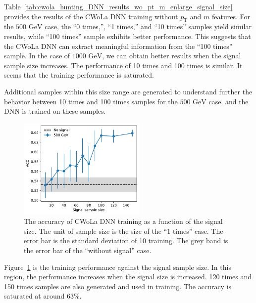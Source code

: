 \documentclass[12pt]{article}
\begin{document}
		Table~\ref{tab:cwola_hunting_DNN_results_wo_pt_m_enlarge_signal_size} provides the results of the CWoLa DNN training without $p_{\text{T}}$ and $m$ features. For the $\text{500 GeV}$ case, the ``0 times,'', ``1 times,'' and ``10 times'' samples yield similar results, while ``100 times'' sample exhibits better performance. This suggests that the CWoLa DNN can extract meaningful information from the ``100 times'' sample. In the case of $\text{1000 GeV}$, we can obtain better results when the signal sample size increases. The performance of 10 times and 100 times is similar. It seems that the training performance is saturated. 

		Additional samples within this size range are generated to understand further the behavior between 10 times and 100 times samples for the $\text{500 GeV}$ case, and the DNN is trained on these samples.

		\begin{figure}[htpb]
			\centering
			\includegraphics[width=0.55\textwidth]{ACC_vs_signal_sample_size-500GeV.pdf}
			\caption{The accuracy of CWoLa DNN training as a function of the signal size. The unit of sample size is the size of the ``1 times'' case. The error bar is the standard deviation of 10 training. The grey band is the error bar of the ``without signal'' case.}
			\label{fig:cwola_hunting_DNN_results_wo_pt_m_various_signal_size_500GeV}
		\end{figure}

		Figure~\ref{fig:cwola_hunting_DNN_results_wo_pt_m_various_signal_size_500GeV} is the training performance against the signal sample size. In this region, the performance increases when the signal size is increased. 120 times and 150 times samples are also generated and used in training. The accuracy is saturated at around 63\%.
\end{document}
